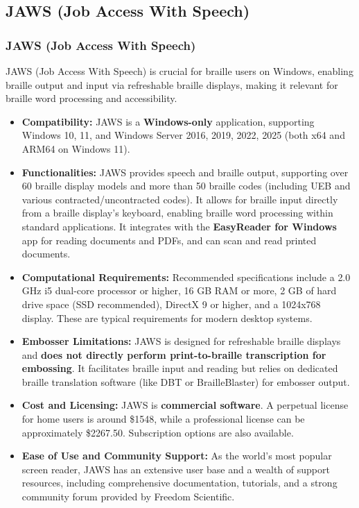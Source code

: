 \subsection{JAWS (Job Access With Speech)}
\subsubsection{JAWS (Job Access With Speech)}
JAWS (Job Access With Speech) is crucial for braille users on Windows, enabling braille output and input via refreshable braille displays, making it relevant for braille word processing and accessibility.

\vspace{1em}
\begin{itemize}
\item \textbf{Compatibility:} JAWS is a \textbf{Windows-only} application, supporting Windows 10, 11, and Windows Server 2016, 2019, 2022, 2025 (both x64 and ARM64 on Windows 11)\footnotemark[5].
\item \textbf{Functionalities:} JAWS provides speech and braille output, supporting over 60 braille display models and more than 50 braille codes (including UEB and various contracted/uncontracted codes). It allows for braille input directly from a braille display's keyboard, enabling braille word processing within standard applications. It integrates with the \textbf{EasyReader for Windows} app for reading documents and PDFs, and can scan and read printed documents\footnotemark[5].
\item \textbf{Computational Requirements:} Recommended specifications include a 2.0 GHz i5 dual-core processor or higher, 16 GB RAM or more, 2 GB of hard drive space (SSD recommended), DirectX 9 or higher, and a 1024x768 display\footnotemark[5]. These are typical requirements for modern desktop systems.
\item \textbf{Embosser Limitations:} JAWS is designed for refreshable braille displays and \textbf{does not directly perform print-to-braille transcription for embossing}. It facilitates braille input and reading but relies on dedicated braille translation software (like DBT or BrailleBlaster) for embosser output.
\item \textbf{Cost and Licensing:} JAWS is \textbf{commercial software}. A perpetual license for home users is around \$1548, while a professional license can be approximately \$2267.50. Subscription options are also available\footnotemark[6].
\item \textbf{Ease of Use and Community Support:} As the world's most popular screen reader, JAWS has an extensive user base and a wealth of support resources, including comprehensive documentation, tutorials, and a strong community forum provided by Freedom Scientific\footnotemark[5].
\end{itemize}
\vspace{1em}

